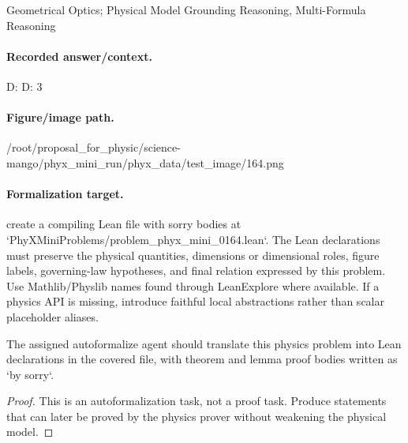 Geometrical Optics; Physical Model Grounding Reasoning, Multi-Formula Reasoning

\paragraph{Recorded answer/context.}
D: D: 3

\paragraph{Figure/image path.}
/root/proposal\_for\_physic/science-mango/phyx\_mini\_run/phyx\_data/test\_image/164.png

\paragraph{Formalization target.}
create a compiling Lean file with sorry bodies at `PhyXMiniProblems/problem\_phyx\_mini\_0164.lean`. The Lean declarations must preserve the physical quantities, dimensions or dimensional roles, figure labels, governing-law hypotheses, and final relation expressed by this problem.
Use Mathlib/Physlib names found through LeanExplore where available. If a physics API is missing, introduce faithful local abstractions rather than scalar placeholder aliases.

\begin{theorem}
\label{thm:physics:phyx_mini_0164:target}
The assigned autoformalize agent should translate this physics problem into Lean declarations in the covered file, with theorem and lemma proof bodies written as `by sorry`.
\end{theorem}
\begin{proof}
This is an autoformalization task, not a proof task. Produce statements that can later be proved by the physics prover without weakening the physical model.
\end{proof}

